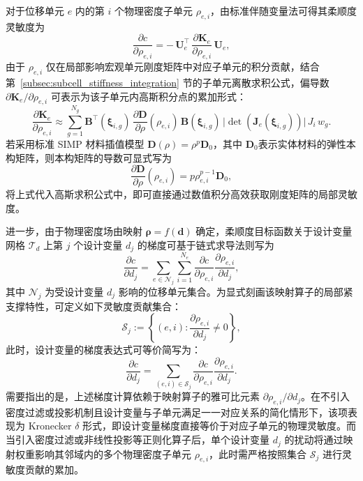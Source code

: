 对于位移单元 $e$ 内的第 $i$ 个物理密度子单元 $\rho_{e,i}$，由标准伴随变量法可得其柔顺度灵敏度为
\[
\frac{\partial c}{\partial \rho_{e,i}} = -\,\boldsymbol U_e^{\top}\,\frac{\partial \boldsymbol K_e}{\partial \rho_{e,i}}\,\boldsymbol U_e,
\]
由于 $\rho_{e,i}$ 仅在局部影响宏观单元刚度矩阵中对应子单元的积分贡献，结合第~\ref{subsec:subcell_stiffness_integration} 节的子单元离散求积公式，偏导数 $\partial\boldsymbol{K}_e/\partial\rho_{e,i}$ 可表示为该子单元内高斯积分点的累加形式：
\begin{equation} \label{eq:ch4_subcell_stiffness_sens}
	\frac{\partial \boldsymbol{K}_e}{\partial \rho_{e,i}} \approx \sum_{g=1}^{N_g} \boldsymbol{B}^{\top}(\boldsymbol\xi_{i,g})\,\frac{\partial \boldsymbol{D}}{\partial \rho}(\rho_{e,i})\,\boldsymbol{B}(\boldsymbol\xi_{i,g})\, \big|\det(\boldsymbol{J}_e(\boldsymbol\xi_{i,g}))\big|\, J_i\, w_g.
\end{equation}
若采用标准 SIMP 材料插值模型 $\boldsymbol{D}(\rho)=\rho^p\boldsymbol{D}_0$，其中 $\boldsymbol{D}_0$表示实体材料的弹性本构矩阵，则本构矩阵的导数可显式写为
\[
\frac{\partial \boldsymbol{D}}{\partial \rho}(\rho_{e,i}) = p\rho_{e,i}^{p-1}\boldsymbol{D}_0,
\]
将上式代入高斯求积公式中，即可直接通过数值积分高效获取刚度矩阵的局部灵敏度。

进一步，由于物理密度场由映射 $\boldsymbol{\rho}=f(\boldsymbol{d})$ 确定，柔顺度目标函数关于设计变量网格 $\mathcal{T}_d$ 上第 $j$ 个设计变量 $d_j$ 的梯度可基于链式求导法则写为
\[
\frac{\partial c}{\partial d_{j}} = \sum_{e \in \mathcal{N}_j} \sum_{i=1}^{N_e} \frac{\partial c}{\partial \rho_{e,i}} \frac{\partial \rho_{e,i}}{\partial d_{j}},
\]
其中 $\mathcal{N}_j$ 为受设计变量 $d_j$ 影响的位移单元集合。为显式刻画该映射算子的局部紧支撑特性，可定义如下灵敏度贡献集合：
\[
\mathcal{S}_{j} := \left\{(e,i) : \frac{\partial \rho_{e,i}}{\partial d_{j}} \neq 0 \right\},
\]
此时，设计变量的梯度表达式可等价简写为：
\begin{equation} \label{eq:ch4_design_var_grad}
	\frac{\partial c}{\partial d_{j}} = \sum_{(e,i) \in \mathcal{S}_{j}} \frac{\partial c}{\partial \rho_{e,i}} \frac{\partial \rho_{e,i}}{\partial d_{j}}.
\end{equation}
需要指出的是，上述梯度计算依赖于映射算子的雅可比元素 $\partial \rho_{e,i}/\partial d_{j}$。在不引入密度过滤或投影机制且设计变量与子单元满足一一对应关系的简化情形下，该项表现为 Kronecker $\delta$ 形式，即设计变量梯度直接等价于对应子单元的物理灵敏度。而当引入密度过滤或非线性投影等正则化算子后，单个设计变量 $d_{j}$ 的扰动将通过映射权重影响其邻域内的多个物理密度子单元 $\rho_{e,i}$，此时需严格按照集合 $\mathcal{S}_j$ 进行灵敏度贡献的累加。


